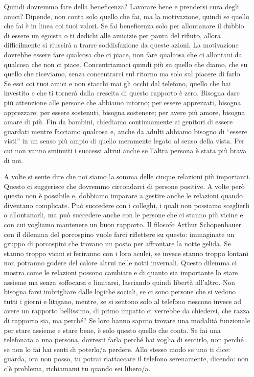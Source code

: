 \documentclass[12pt]{book} %
\begin{document}
Quindi dovremmo fare della beneficenza? Lavorare bene e prendersi cura degli amici? Dipende, non conta solo quello che
fai, ma la motivazione, quindi se quello che fai è in linea coi tuoi valori. Se fai beneficenza solo per allontanare il
dubbio di essere un egoista o ti dedichi alle amicizie per paura del rifiuto, allora difficilmente si riuscirà a trarre
soddisfazione da queste azioni. La motivazione dovrebbe essere fare qualcosa che ci piace, non fare qualcosa che ci
allontani da qualcosa che non ci piace. Concentriamoci quindi più su quello che diamo, che su quello che riceviamo,
senza concentrarci sul ritorno ma solo sul piacere di farlo. Se esci coi tuoi amici e non stacchi mai gli occhi dal
telefono, quello che hai investito e che ti tornerà dalla crescita di questo rapporto è zero. Bisogna dare più
attenzione alle persone che abbiamo intorno; per essere apprezzati, bisogna apprezzare; per essere sostenuti, bisogna
sostenere; per avere più amore, bisogna amare di più. Fin da bambini, chiediamo continuamente ai genitori di essere
guardati mentre facciamo qualcosa e, anche da adulti abbiamo bisogno di “essere visti” in un senso più ampio di quello
meramente legato al senso della vista. Per cui non vanno sminuiti i successi altrui anche se l'altra persona è stata
più brava di noi.


\bigskip

A volte si sente dire che noi siamo la somma delle cinque relazioni più importanti. Questo ci suggerisce che dovremmo
circondarci di persone positive. A volte però questo non è possibile e, dobbiamo imparare a gestire anche le relazioni
quando diventano complicate. Può succedere con i colleghi, i quali non possiamo sceglierli o allontanarli, ma può
succedere anche con le persone che ci stanno più vicine e con cui vogliamo mantenere un buon rapporto. Il filosofo
Arthur Schopenhauer con il dilemma del porcospino vuole farci riflettere su questo: immaginate un gruppo di porcospini
che trovano un posto per affrontare la notte gelida. Se stanno troppo vicini si feriranno con i loro aculei, se invece
stanno troppo lontani non potranno godere del calore altrui nelle notti invernali. Questo dilemma ci mostra come le
relazioni possono cambiare e di quanto sia importante lo stare assieme ma senza soffocarsi e limitarsi, lasciando
quindi libertà all'altro. Non bisogna farsi imbrigliare dalle logiche sociali, se ci sono persone
che si vedono tutti i giorni e litigano, mentre, se si sentono solo al telefono riescono invece ad avere un rapporto
bellissimo, di primo impatto ci verrebbe da chiedersi, che razza di rapporto sia, ma perché? Se loro hanno saputo
trovare una modalità funzionale per stare assieme e stare bene, è solo questo quello che conta. Se fai una telefonata a
una persona, dovresti farla perché hai voglia di sentirlo, non perché se non lo fai hai senti di poterlo/a perdere.
Allo stesso modo se uno ti dice: guarda, ora non posso, tu potrai riattaccare il telefono serenamente, dicendo: non c'è
problema, richiamami tu quando sei libero/a.
\end{document}
